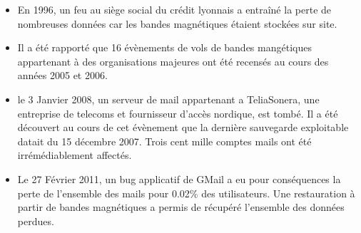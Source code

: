 \documentclass[a4paper,11pt]{report}
\begin{document}
\begin{itemize}
\item En 1996, un feu au siège social du crédit lyonnais a entraîné la perte de nombreuses données car les bandes magnétiques étaient stockées sur site.
\item Il a été rapporté que 16 évènements de vols de bandes mangétiques appartenant à des organisations majeures ont été recensés au cours des années 2005 et 2006.
\item le 3 Janvier 2008, un serveur de mail appartenant a TeliaSonera, une entreprise de telecoms et fournisseur d'accès nordique, est tombé. Il a été découvert au cours de cet évènement que la dernière sauvegarde exploitable datait du 15 décembre 2007. Trois cent mille comptes mails ont été irrémédiablement affectés. 
\item Le 27 Février 2011, un bug applicatif de GMail a eu pour conséquences la perte de l'ensemble des mails pour 0.02\% des utilisateurs. Une restauration à partir de bandes magnétiques a permis de récupéré l'ensemble des données perdues.
\end{itemize}

\end{document}
